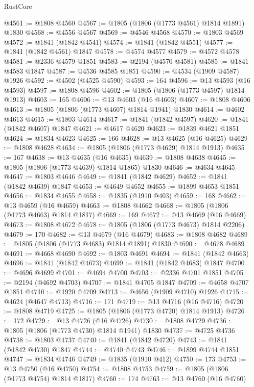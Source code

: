 \begin{lexlean}{RustCore}
\begin{coremodule}
@4561 := @1808 @4560
@4567 := @1805 (@1806 (@1773 @4561) @1814 @1891) @1830
@4568 := @4556 @4567
@4569 := @4546 @4568
@4570 := @1803 @4569
@4572 := @1841 (@1842 @4541)
@4574 := @1841 (@1842 @4551)
@4577 := @1841 (@1842 @4561) @1847
@4578 := @4574 @4577
@4579 := @4572 @4578
@4581 := @2336 @4579 @1851
@4583 := @2194 (@4570 @4581)
@4585 := @1841 @4583 @1847
@4587 := @4536 @4585 @1851
@4590 := @4534 (@1909 @4587) @1926
@4592 := @4502 (@4525 @4590)
@4593 := 164
@4596 := @13 @4593 (@16 @4593)
@4597 := @1808 @4596
@4602 := @1805 (@1806 (@1773 @4597) @1814 @1913)
@4603 := 165
@4606 := @13 @4603 (@16 @4603)
@4607 := @1808 @4606
@4613 := @1805 (@1806 (@1773 @4607) @1814 @1941) @1830
@4614 := @4602 @4613
@4615 := @1803 @4614
@4617 := @1841 (@1842 @4597)
@4620 := @1841 (@1842 @4607) @1847
@4621 := @4617 @4620
@4623 := @1839 @4621 @1851
@4624 := @1834 @4623
@4625 := 166
@4628 := @13 @4625 (@16 @4625)
@4629 := @1808 @4628
@4634 := @1805 (@1806 (@1773 @4629) @1814 @1913)
@4635 := 167
@4638 := @13 @4635 (@16 @4635)
@4639 := @1808 @4638
@4645 := @1805 (@1806 (@1773 @4639) @1814 @1865) @1830
@4646 := @4634 @4645
@4647 := @1803 @4646
@4649 := @1841 (@1842 @4629)
@4652 := @1841 (@1842 @4639) @1847
@4653 := @4649 @4652
@4655 := @1899 @4653 @1851
@4656 := @1834 @4655
@4658 := @1835 (@1910 @403)
@4659 := 168
@4662 := @13 @4659 (@16 @4659)
@4663 := @1808 @4662
@4668 := @1805 (@1806 (@1773 @4663) @1814 @1817)
@4669 := 169
@4672 := @13 @4669 (@16 @4669)
@4673 := @1808 @4672
@4678 := @1805 (@1806 (@1773 @4673) @1814 @2206)
@4679 := 170
@4682 := @13 @4679 (@16 @4679)
@4683 := @1808 @4682
@4689 := @1805 (@1806 (@1773 @4683) @1814 @1891) @1830
@4690 := @4678 @4689
@4691 := @4668 @4690
@4692 := @1803 @4691
@4694 := @1841 (@1842 @4663)
@4696 := @1841 (@1842 @4673)
@4699 := @1841 (@1842 @4683) @1847
@4700 := @4696 @4699
@4701 := @4694 @4700
@4703 := @2336 @4701 @1851
@4705 := @2194 (@4692 @4703)
@4707 := @1841 @4705 @1847
@4709 := @4658 @4707 @1851
@4710 := @1920 @4709
@4713 := @4656 (@1909 @4710) @1926
@4715 := @4624 (@4647 @4713)
@4716 := 171
@4719 := @13 @4716 (@16 @4716)
@4720 := @1808 @4719
@4725 := @1805 (@1806 (@1773 @4720) @1814 @1913)
@4726 := 172
@4729 := @13 @4726 (@16 @4726)
@4730 := @1808 @4729
@4736 := @1805 (@1806 (@1773 @4730) @1814 @1941) @1830
@4737 := @4725 @4736
@4738 := @1803 @4737
@4740 := @1841 (@1842 @4720)
@4743 := @1841 (@1842 @4730) @1847
@4744 := @4740 @4743
@4746 := @1899 @4744 @1851
@4747 := @1834 @4746
@4749 := @1835 (@1910 @412)
@4750 := 173
@4753 := @13 @4750 (@16 @4750)
@4754 := @1808 @4753
@4759 := @1805 (@1806 (@1773 @4754) @1814 @1817)
@4760 := 174
@4763 := @13 @4760 (@16 @4760)

\end{coremodule}
\end{lexlean}
